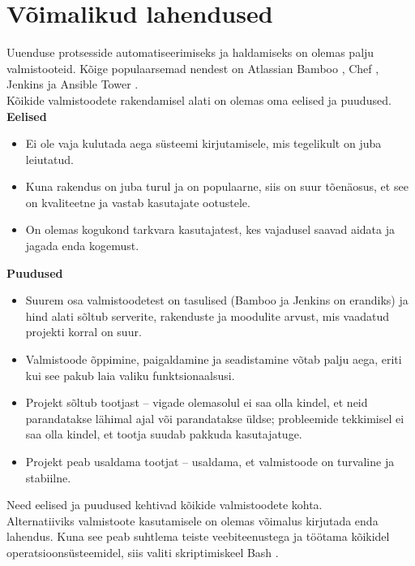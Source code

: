 \documentclass[12pt]{report}
\begin{document}
  \section{Võimalikud lahendused}
  
  Uuenduse protsesside automatiseerimiseks ja haldamiseks on olemas palju valmistooteid. Kõige populaarsemad nendest on Atlassian Bamboo \cite{bamboo}, Chef \cite{chef}, Jenkins \cite{jenkins} ja Ansible Tower \cite{ansible}.\\
  
  Kõikide valmistoodete rakendamisel alati on olemas oma eelised ja puudused.\\
  
  \textbf{Eelised}
  \begin{itemize}
    \item Ei ole vaja kulutada aega süsteemi kirjutamisele, mis tegelikult on juba leiutatud.
    \item Kuna rakendus on juba turul ja on populaarne, siis on suur tõenäosus, et see on kvaliteetne ja vastab kasutajate ootustele.
    \item On olemas kogukond tarkvara kasutajatest, kes vajadusel saavad aidata ja jagada enda kogemust.
  \end{itemize}
  
  \textbf{Puudused}
  \begin{itemize}
    \item Suurem osa valmistoodetest on tasulised (Bamboo ja Jenkins on erandiks) ja hind alati sõltub serverite, rakenduste ja moodulite arvust, mis vaadatud projekti korral on suur.
    \item Valmistoode õppimine, paigaldamine ja seadistamine võtab palju aega, eriti kui see pakub laia valiku funktsionaalsusi.
    \item Projekt sõltub tootjast \--- vigade olemasolul ei saa olla kindel, et neid parandatakse lähimal ajal või parandatakse üldse; probleemide tekkimisel ei saa olla kindel, et tootja suudab pakkuda kasutajatuge.
    \item Projekt peab usaldama tootjat \--- usaldama, et valmistoode on turvaline ja stabiilne.
  \end{itemize}
  
  Need eelised ja puudused kehtivad kõikide valmistoodete kohta.\\
  
  Alternatiiviks valmistoote kasutamisele on olemas võimalus kirjutada enda lahendus. Kuna see peab suhtlema teiste veebiteenustega ja töötama kõikidel operatsioonsüsteemidel, siis valiti skriptimiskeel Bash \cite{bash,bash-book}.\\
  
\end{document}
